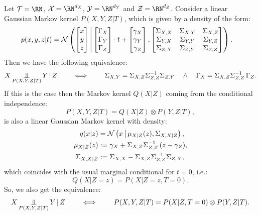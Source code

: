 \begin{Thm}
Let $\Tcal = \RN$, $\Xcal = \RN^{d_X}$, $\Ycal = \RN^{d_Y}$ and $\Zcal = \RN^{d_Z}$. 
Consider a linear Gaussian Markov kernel $P(X,Y,Z|T)$, which is given by a density of the form:
\begin{align*}
    p(x,y,z|t) &= \mathcal{N}\left ( \begin{bmatrix}x\\y\\z\end{bmatrix} \,\middle|\, \begin{bmatrix}\Gamma_X\\\Gamma_Y\\\Gamma_Z\end{bmatrix} \cdot t + \begin{bmatrix}\gamma_X\\\gamma_Y\\\gamma_Z\end{bmatrix} , \begin{bmatrix}\Sigma_{X,X}&\Sigma_{X,Y}&\Sigma_{X,Z}\\\Sigma_{Y,X}&\Sigma_{Y,Y}&\Sigma_{Y,Z}\\\Sigma_{Z,X}&\Sigma_{Z,Y}&\Sigma_{Z,Z}\end{bmatrix} \right ). 
\end{align*}
Then we have the following equivalence:
\[X \operatorname*{\perp\mkern-11mu\perp}_{P(X,Y,Z|T)} Y \operatorname*{|} Z \qquad \iff \qquad \Sigma_{X,Y} = \Sigma_{X,Z} \Sigma_{Z,Z}^{-1}\Sigma_{Z,Y} 
\quad \land \quad \Gamma_X = \Sigma_{X,Z}\Sigma_{Z,Z}^{-1}\,\Gamma_Z. \]
If this is the case then the Markov kernel $Q(X|Z)$ coming from the conditional independence:
\[P(X,Y,Z|T) = Q(X|Z) \otimes P(Y,Z|T),\]
is also a linear Gaussian Markov kernel with density:
\begin{align*}
    q(x|z) &= \mathcal{N}\left ( x \,\middle|\, \mu_{X|Z}(z), \Sigma_{X,X|Z} \right ),\\ 
    \mu_{X|Z}(z)   &:= \gamma_X + \Sigma_{X,Z}\Sigma_{Z,Z}^{-1}\, (z-\gamma_Z),\\
    \Sigma_{X,X|Z} & := \Sigma_{X,X} - \Sigma_{X,Z}\Sigma_{Z,Z}^{-1} \Sigma_{Z,X},
\end{align*}
which coincides with the usual marginal conditional for $t=0$, i.e.:
\[Q(X|Z=z) = P(X|Z=z,T=0).\]
So, we also get the equivalence:
\[X \operatorname*{\perp\mkern-11mu\perp}_{P(X,Y,Z|T)} Y \operatorname*{|} Z \qquad \iff \qquad P(X,Y,Z|T) = P(X|Z,T=0) \otimes P(Y,Z|T). \]
\end{Thm}

